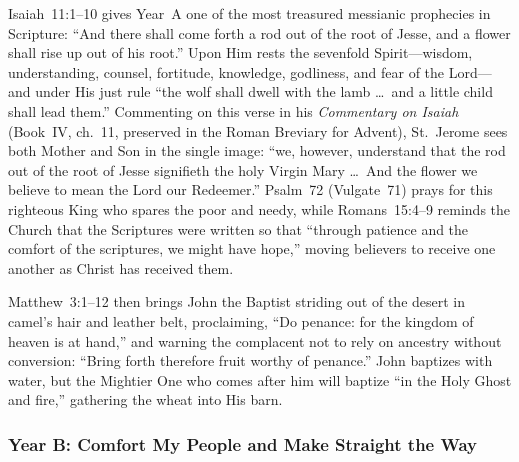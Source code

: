 Isaiah~11:1--10 gives Year~A one of the most treasured messianic prophecies in Scripture: ``And there shall come forth a rod out of the root of Jesse, and a flower shall rise up out of his root.'' Upon Him rests the sevenfold Spirit---wisdom, understanding, counsel, fortitude, knowledge, godliness, and fear of the Lord---and under His just rule ``the wolf shall dwell with the lamb \dots\ and a little child shall lead them.'' Commenting on this verse in his \textit{Commentary on Isaiah} (Book~IV, ch.~11, preserved in the Roman Breviary for Advent), St.~Jerome sees both Mother and Son in the single image: ``we, however, understand that the rod out of the root of Jesse signifieth the holy Virgin Mary \dots\ And the flower we believe to mean the Lord our Redeemer.'' Psalm~72 (Vulgate~71) prays for this righteous King who spares the poor and needy, while Romans~15:4--9 reminds the Church that the Scriptures were written so that ``through patience and the comfort of the scriptures, we might have hope,'' moving believers to receive one another as Christ has received them.

Matthew~3:1--12 then brings John the Baptist striding out of the desert in camel's hair and leather belt, proclaiming, ``Do penance: for the kingdom of heaven is at hand,'' and warning the complacent not to rely on ancestry without conversion: ``Bring forth therefore fruit worthy of penance.'' John baptizes with water, but the Mightier One who comes after him will baptize ``in the Holy Ghost and fire,'' gathering the wheat into His barn.

\subsubsection{Year B: Comfort My People and Make Straight the Way}

